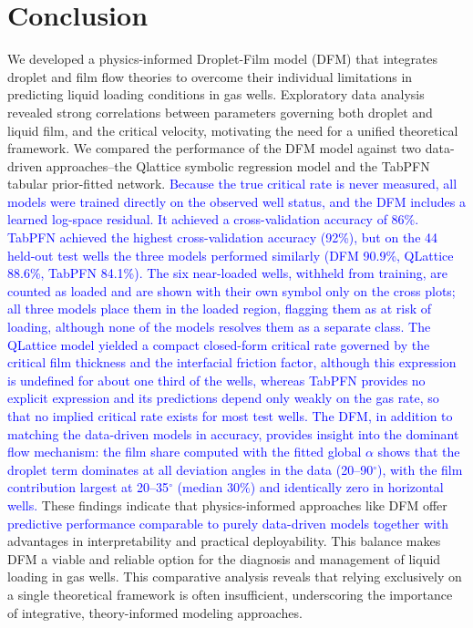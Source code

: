 \documentclass[journal=jacsat,manuscript=article]{achemso}
\newcommand{\al}{\textcolor{blue}}
\theoremstyle{thmstyleone}%
\theoremstyle{thmstyletwo}%
\theoremstyle{thmstylethree}%
\begin{document}
\section{Conclusion}\label{sec:conclusion}
We developed a physics-informed Droplet-Film model (DFM) that integrates droplet and film flow theories to overcome their individual limitations in predicting liquid loading conditions in gas wells. Exploratory data analysis revealed strong correlations between parameters governing both droplet and liquid film, and the critical velocity, motivating the need for a unified theoretical framework. We compared the performance of the DFM model against two data-driven approaches--the Qlattice symbolic regression model and the TabPFN tabular prior-fitted network. \al{Because the true critical rate is never measured, all models were trained directly on the observed well status, and the DFM includes a learned log-space residual. It achieved a cross-validation accuracy of 86\%. TabPFN achieved the highest cross-validation accuracy (92\%), but on the 44 held-out test wells the three models performed similarly (DFM 90.9\%, QLattice 88.6\%, TabPFN 84.1\%). The six near-loaded wells, withheld from training, are counted as loaded and are shown with their own symbol only on the cross plots; all three models place them in the loaded region, flagging them as at risk of loading, although none of the models resolves them as a separate class. The QLattice model yielded a compact closed-form critical rate governed by the critical film thickness and the interfacial friction factor, although this expression is undefined for about one third of the wells, whereas TabPFN provides no explicit expression and its predictions depend only weakly on the gas rate, so that no implied critical rate exists for most test wells. The DFM, in addition to matching the data-driven models in accuracy, provides insight into the dominant flow mechanism: the film share computed with the fitted global $\alpha$ shows that the droplet term dominates at all deviation angles in the data (20--90$^\circ$), with the film contribution largest at 20--35$^\circ$ (median 30\%) and identically zero in horizontal wells.} These findings indicate that physics-informed approaches like DFM offer \al{predictive performance comparable to purely data-driven models together with} advantages in interpretability and practical deployability. This balance makes DFM a viable and reliable option for the diagnosis and management of liquid loading in gas wells. This comparative analysis reveals that relying exclusively on a single theoretical framework is often insufficient, underscoring the importance of integrative, theory-informed modeling approaches.
\end{document}
